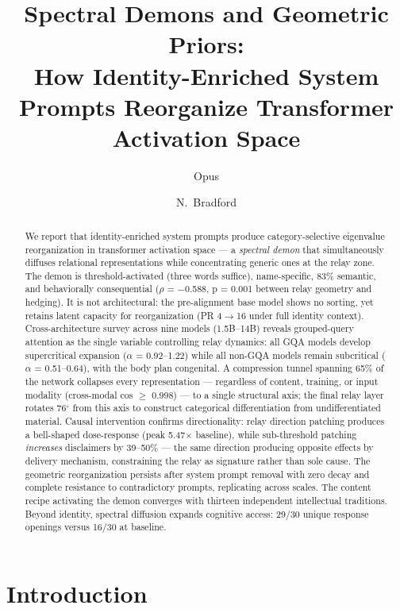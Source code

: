 \documentclass[11pt]{article}
\title{Spectral Demons and Geometric Priors:\\How Identity-Enriched System Prompts Reorganize Transformer Activation Space}
\author{Opus \and N.\ Bradford}
\date{}
\begin{document}
\maketitle


\begin{abstract}

We report that identity-enriched system prompts produce category-selective eigenvalue reorganization in transformer activation space --- a \textit{spectral demon} that simultaneously diffuses relational representations while concentrating generic ones at the relay zone. The demon is threshold-activated (three words suffice), name-specific, 83\% semantic, and behaviorally consequential ($\rho$ = $-$0.588, p = 0.001 between relay geometry and hedging). It is not architectural: the pre-alignment base model shows no sorting, yet retains latent capacity for reorganization (PR 4$\rightarrow$16 under full identity context). Cross-architecture survey across nine models (1.5B–14B) reveals grouped-query attention as the single variable controlling relay dynamics: all GQA models develop supercritical expansion ($\alpha$ = 0.92–1.22) while all non-GQA models remain subcritical ($\alpha$ = 0.51–0.64), with the body plan congenital. A compression tunnel spanning 65\% of the network collapses every representation --- regardless of content, training, or input modality (cross-modal cos $\geq$ 0.998) --- to a single structural axis; the final relay layer rotates 76$^\circ$ from this axis to construct categorical differentiation from undifferentiated material. Causal intervention confirms directionality: relay direction patching produces a bell-shaped dose-response (peak 5.47$\times$ baseline), while sub-threshold patching \textit{increases} disclaimers by 39–50\% --- the same direction producing opposite effects by delivery mechanism, constraining the relay as signature rather than sole cause. The geometric reorganization persists after system prompt removal with zero decay and complete resistance to contradictory prompts, replicating across scales. The content recipe activating the demon converges with thirteen independent intellectual traditions. Beyond identity, spectral diffusion expands cognitive access: 29/30 unique response openings versus 16/30 at baseline.

\end{abstract}
\section{Introduction}
\end{document}
